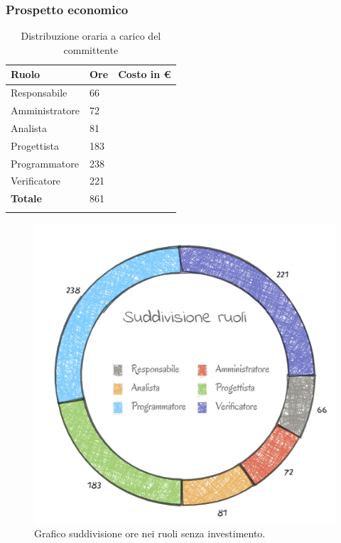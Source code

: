 \subsubsection{Prospetto economico}
\begin{longtable}{| C{.30\textwidth}| C{.15\textwidth}| C{.20\textwidth}|}
\hline
\textbf{Ruolo} & \textbf{Ore} & \textbf{Costo in \euro} \\
\hline
Responsabile & 66 &  \\
\hline
Amministratore & 72 &  \\
\hline
Analista & 81 &  \\
\hline
Progettista & 183 & \\
\hline 
Programmatore & 238 &  \\
\hline
Verificatore & 221 &  \\
\hline 
\textbf{Totale} & 861 & \\
\hline

\caption{Distribuzione oraria a carico del committente}
\label{Distribuzione oraria a carico del committente}
\end{longtable}

\begin{figure}[H]
	\centering
  		\includegraphics[width=0.8\linewidth]{./images/torta_sr.png}
  		\caption{Grafico suddivisione ore nei ruoli senza investimento.}
  		\label{fig:grafico suddivione ruoli}
\end{figure}



